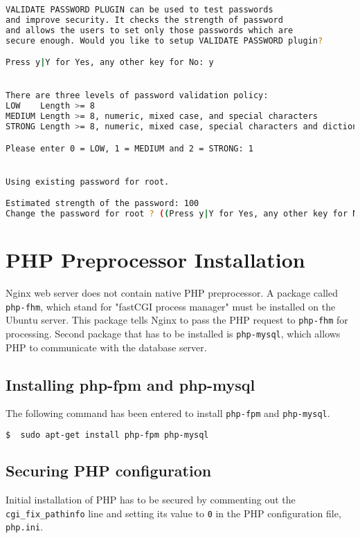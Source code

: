 \begin{lstlisting}[language=sh]
VALIDATE PASSWORD PLUGIN can be used to test passwords
and improve security. It checks the strength of password
and allows the users to set only those passwords which are
secure enough. Would you like to setup VALIDATE PASSWORD plugin?

Press y|Y for Yes, any other key for No: y


There are three levels of password validation policy:
LOW    Length >= 8
MEDIUM Length >= 8, numeric, mixed case, and special characters
STRONG Length >= 8, numeric, mixed case, special characters and dictionary file

Please enter 0 = LOW, 1 = MEDIUM and 2 = STRONG: 1


Using existing password for root.

Estimated strength of the password: 100
Change the password for root ? ((Press y|Y for Yes, any other key for No) : n
\end{lstlisting}

\section{PHP Preprocessor Installation} \label{sec:php-preprocessor-installation}
Nginx web server does not contain native PHP preprocessor. A package called \texttt{php-fhm}, which stand for "fastCGI process manager" must be installed on the Ubuntu server. This package tells Nginx to pass the PHP request to \texttt{php-fhm} for processing. Second package that has to be installed is \texttt{php-mysql}, which allows PHP to communicate with the database server.

\subsection*{Installing php-fpm and php-mysql}
The following command has been entered to install \texttt{php-fpm} and \texttt{php-mysql}.
\begin{lstlisting}[language=sh]
$  sudo apt-get install php-fpm php-mysql
\end{lstlisting}

\subsection*{Securing PHP configuration}
Initial installation of PHP has to be secured by commenting out the \texttt{cgi\_fix\_pathinfo} line and setting its value to \texttt{0} in the PHP configuration file, \texttt{php.ini}.

